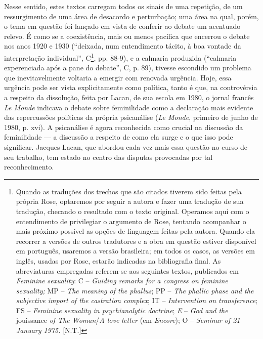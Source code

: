 Nesse sentido, estes textos carregam todos os sinais de uma repetição,
de um ressurgimento de uma área de desacordo e perturbação; uma área na
qual, porém, o tema em questão foi lançado em vista de conferir ao
debate um acentuado relevo. É como se a coexistência, mais ou menos
pacífica que encerrou o debate nos anos 1920 e 1930 (``deixada, num
entendimento tácito, à boa vontade da interpretação individual'',
C\footnote{Quando as traduções dos trechos que são citados tiverem sido
  feitas pela própria Rose, optaremos por seguir a autora e fazer uma
  tradução de sua tradução, checando o resultado com o texto original.
  Operamos aqui com o entendimento de privilegiar o argumento de Rose,
  tentando acompanhar o mais próximo possível as opções de linguagem
  feitas pela autora. Quando ela recorrer a versões de outros tradutores
  e a obra em questão estiver disponível em português, usaremos a versão
  brasileira; em todos os casos, as versões em inglês, usadas por Rose,
  estarão indicadas na bibliografia final. As abreviaturas empregadas
  referem-se aos seguintes textos, publicados em \emph{Feminine
  sexuality}: C -- \emph{Guiding remarks for a congress on feminine
  sexuality;} MP -- \emph{The meaning of the phallus}; PP -- \emph{The
  phallic phase and the subjective import of the castration complex};
  IT -- \emph{Intervention on transference}; FS -- \emph{Feminine
  sexuality in psychianalytic doctrine}; \emph{E} -- \emph{God and the}
  jouissance \emph{of The Woman}/\emph{A love letter} (em
  \emph{Encore}); O -- \emph{Seminar of 21 January 1975.} {[}N.T.{]}},
pp. 88-9), e a calmaria produzida (``calmaria experenciada após a pane
do debate'', C, p. 89), tivesse escondido um problema que
inevitavelmente voltaria a emergir com renovada urgência. Hoje, essa
urgência pode ser vista explicitamente como política, tanto é que, na
controvérsia a respeito da dissolução, feita por Lacan, de sua escola em
1980, o jornal francês \emph{Le Monde} indicava o debate sobre
feminilidade como a declaração mais evidente das repercussões políticas
da própria psicanálise (\emph{Le Monde}, primeiro de junho de 1980, p.
xvi). A psicanálise é agora reconhecida como crucial na discussão da
feminilidade --- a discussão a respeito de como ela surge e o que isso
pode significar. Jacques Lacan, que abordou cada vez mais essa questão
no curso de seu trabalho, tem estado no centro das disputas provocadas
por tal reconhecimento.

